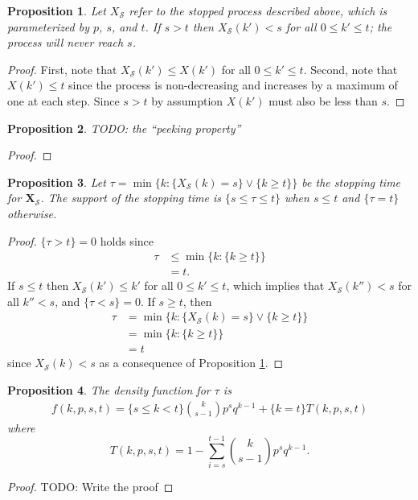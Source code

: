 \documentclass{article}
\newtheorem{prop}{Proposition}
\begin{document}
\begin{prop} \label{prop:sandt}
Let $X_\mathcal{S}$ refer to the stopped process described above, which
is parameterized by $p$, $s$, and $t$.  
If $s > t$ then 
$X_\mathcal{S}(k') < s$ for all $0 \leq k' \leq t$; the process will never
reach $s$. 
\end{prop}
\begin{proof}
First, note that $X_\mathcal{S}(k') \leq X(k')$ for all $0 \leq k' \leq t$.
Second, note that $X(k') \leq t$ since the process
is non-decreasing and increases by a maximum of one at each step.
Since $s > t$ by assumption $X(k')$ must also be less than $s$.
\end{proof}

\begin{prop}
TODO: the ``peeking property''
\end{prop}
\begin{proof}
\end{proof}

\begin{prop}
Let $\tau = \min\{ k: \{X_\mathcal{S}(k) = s\} \vee \{k \geq t\} \}$ be 
the stopping time for $\mathbf{X_\mathcal{S}}$. The support of the 
stopping time is
$\{ s \leq \tau \leq t \}$ when $s \leq t$ and $\{\tau = t\}$ otherwise.
\end{prop}
\begin{proof}
$\{\tau > t \} = 0$ holds since 
\begin{align*}
\tau &\leq \min\{k : \{k \geq t\} \} \\
  & = t.
\end{align*}
If $s \leq t$ then 
$X_\mathcal{S}(k') \leq k'$ for all $0 \leq k' \leq t$, which implies
that $X_\mathcal{S}(k'') < s$ for all $k'' < s$, and $\{\tau < s\} = 0$. 
If $s \geq t$, then 
\begin{align*}
\tau &= \min\{k : \{X_\mathcal{S}(k) = s\} \vee \{k \geq t\} \} \\
  & = \min\{k : \{k \geq t\} \} \\
  & = t
\end{align*}
since $X_\mathcal{S}(k) < s$ as a consequence of Proposition \ref{prop:sandt}.
\end{proof}

\begin{prop}
The density function for $\tau$ is
\begin{align*}
f\left(k, p, s, t\right) = \{s \leq k < t\} {k \choose s-1} p^s q^{k-1} + 
  \{k=t\} T(k, p, s, t) 
\end{align*}
where
\begin{equation} \label{eqn:tail}
T(k, p, s, t) = 1 - \sum_{i=s}^{t-1} {k \choose s-1} p^s q^{k-1}.
\end{equation}
\end{prop}
\begin{proof}
TODO: Write the proof
\end{proof}
\end{document}
